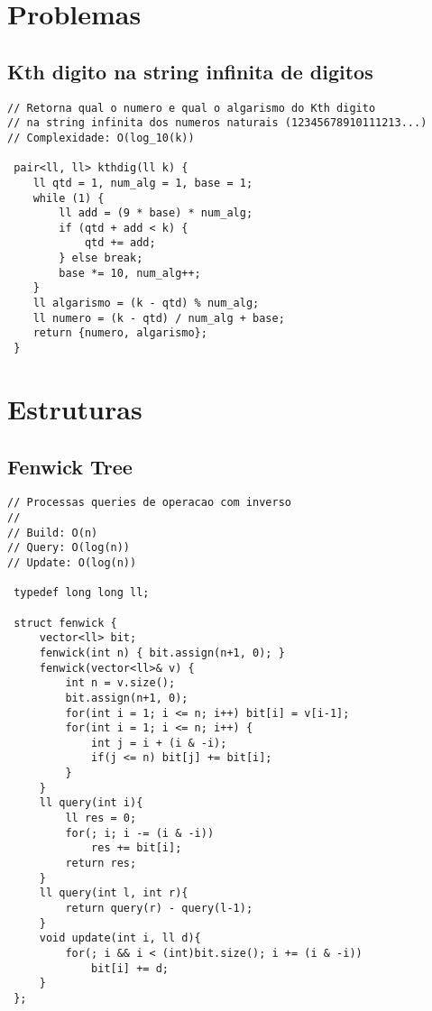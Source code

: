 \documentclass[11pt, a4paper, twoside]{article}
\begin{document}
\clearpage


%
%

\section{Problemas}

\subsection{Kth digito na string infinita de digitos}
\begin{lstlisting}
// Retorna qual o numero e qual o algarismo do Kth digito
// na string infinita dos numeros naturais (12345678910111213...)
// Complexidade: O(log_10(k))

 pair<ll, ll> kthdig(ll k) {
 	ll qtd = 1, num_alg = 1, base = 1;
 	while (1) {
 		ll add = (9 * base) * num_alg;
 		if (qtd + add < k) {
 			qtd += add;
 		} else break;
 		base *= 10, num_alg++;
 	}
 	ll algarismo = (k - qtd) % num_alg;
 	ll numero = (k - qtd) / num_alg + base;
 	return {numero, algarismo};
 }
\end{lstlisting}

\clearpage


%
%

\section{Estruturas}

\subsection{Fenwick Tree}
\begin{lstlisting}
// Processas queries de operacao com inverso
//
// Build: O(n)
// Query: O(log(n))
// Update: O(log(n))

 typedef long long ll;
 
 struct fenwick {
     vector<ll> bit;
     fenwick(int n) { bit.assign(n+1, 0); }
     fenwick(vector<ll>& v) {
         int n = v.size();
         bit.assign(n+1, 0);
         for(int i = 1; i <= n; i++) bit[i] = v[i-1];
         for(int i = 1; i <= n; i++) {
             int j = i + (i & -i);
             if(j <= n) bit[j] += bit[i];
         }
     }
     ll query(int i){
         ll res = 0;
         for(; i; i -= (i & -i))
             res += bit[i];
         return res;
     }
     ll query(int l, int r){
         return query(r) - query(l-1);
     }
     void update(int i, ll d){
         for(; i && i < (int)bit.size(); i += (i & -i))
             bit[i] += d;
     }
 };
\end{lstlisting}
\end{document}
